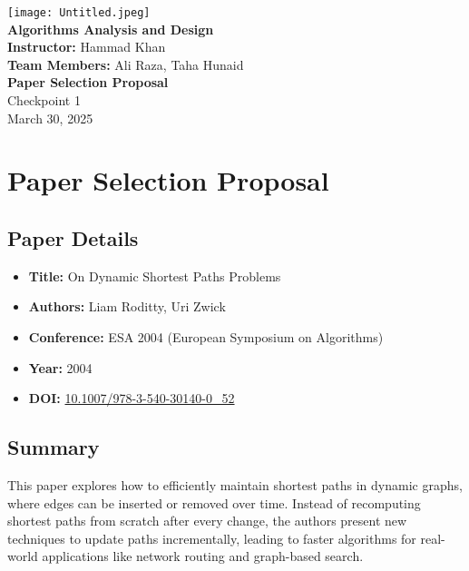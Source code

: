 \documentclass{report}
\begin{document}
\begin{titlepage}
    \centering
    \vspace*{2cm}
    \texttt{[image: Untitled.jpeg]} \\
    
    \large
    \textbf{Algorithms Analysis and Design} \\[1cm]
    
    \normalsize
    \textbf{Instructor:} Hammad Khan \\[0.5cm]
    \textbf{Team Members:} Ali Raza, Taha Hunaid \\[1cm]
    
    \normalsize
    \textbf{Paper Selection Proposal} \\[0.5cm]
    \normalsize
    Checkpoint 1 \\[0.5cm]
    
    \normalsize
    March 30, 2025 %
    
    \vfill
\end{titlepage}

\newpage
{}

\section*{Paper Selection Proposal}

\subsection*{Paper Details}
\begin{itemize}
    \item \textbf{Title:} On Dynamic Shortest Paths Problems
    \item \textbf{Authors:} Liam Roditty, Uri Zwick
    \item \textbf{Conference:} ESA 2004 (European Symposium on Algorithms)
    \item \textbf{Year:} 2004
    \item \textbf{DOI:} \href{https://doi.org/10.1007/978-3-540-30140-0\_52}{10.1007/978-3-540-30140-0\_52}
\end{itemize}

\subsection*{Summary}
This paper explores how to efficiently maintain shortest paths in dynamic graphs, where edges can be inserted or removed over time. Instead of recomputing shortest paths from scratch after every change, the authors present new techniques to update paths incrementally, leading to faster algorithms for real-world applications like network routing and graph-based search.
\end{document}
